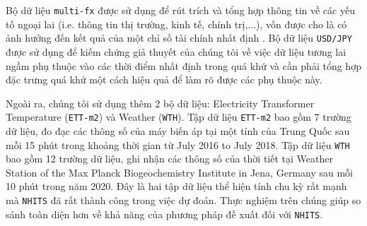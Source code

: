 \documentclass[aps,prb,groupedaddress,twocolumn,showpacs,dvipdfmx,superscriptaddress,pdftex]{revtex4-2}
\begin{document}

\vspace{2mm}

Bộ dữ liệu \verb|multi-fx| được sử dụng để rút trích và tổng hợp thông tin về các yếu tố ngoại lai (i.e. thông tin thị trường, kinh tế, chính trị,...), vốn được cho là có ảnh hưởng đến kết quả của một chỉ số tài chính nhất định \citep{overreactioncontrarian,fama1970efficient,mech1993portfolio}. Bộ dữ liệu \verb|USD/JPY| được sử dụng để kiếm chứng giả thuyết của chúng tôi về việc dữ liệu tương lai ngầm phụ thuộc vào các thời điểm nhất định trong quá khứ và cần phải tổng hợp đặc trưng quá khứ một cách hiệu quả để làm rõ được các phụ thuộc này.


\vspace{2mm}

Ngoài ra, chúng tôi sử dụng thêm 2 bộ dữ liệu: Electricity Transformer Temperature (\verb|ETT-m2|) và Weather (\verb|WTH|). Tập dữ liệu \verb|ETT-m2| bao gồm 7 trường dữ liệu, đo đạc các thông số của máy biến áp tại một tỉnh của Trung Quốc sau mỗi 15 phút trong khoảng thời gian từ July 2016 to July 2018. Tập dữ liệu \verb|WTH| bao gồm 12 trường dữ liệu, ghi nhận các thông số của thời tiết tại Weather Station of the Max Planck Biogeochemistry Institute in Jena, Germany sau mỗi 10 phút trong năm 2020. Đây là hai tập dữ liệu thể hiện tính chu kỳ rất mạnh mà \verb|NHITS| đã rất thành công trong việc dự đoán. Thực nghiệm trên chúng giúp so sánh toàn diện hơn về khả năng của phương pháp đề xuất đối với \verb|NHITS|.
\end{document}
